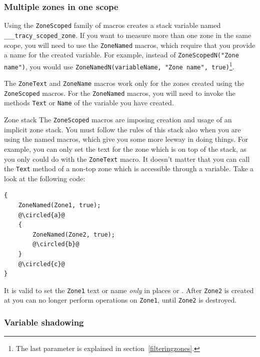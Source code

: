\documentclass[hidelinks,titlepage,a4paper]{article}
\newcommand*\circled[1]{\tikz[baseline=(char.base)]{
    \node[shape=circle,draw,inner sep=1.5pt] (char) {#1};}}
\begin{document}
\subsubsection{Multiple zones in one scope}
\label{multizone}

Using the \texttt{ZoneScoped} family of macros creates a stack variable named \texttt{\_\_\_tracy\_scoped\_zone}. If you want to measure more than one zone in the same scope, you will need to use the \texttt{ZoneNamed} macros, which require that you provide a name for the created variable. For example, instead of \texttt{ZoneScopedN("Zone name")}, you would use \texttt{ZoneNamedN(variableName, "Zone name", true)}\footnote{The last parameter is explained in section~\ref{filteringzones}.}.

The \texttt{ZoneText} and \texttt{ZoneName} macros work only for the zones created using the \texttt{ZoneScoped} macros. For the \texttt{ZoneNamed} macros, you will need to invoke the methods \texttt{Text} or \texttt{Name} of the variable you have created.

\begin{bclogo}[
noborder=true,
couleur=black!5,
logo=\bcattention
]{Zone stack}
The \texttt{ZoneScoped} macros are imposing creation and usage of an implicit zone stack. You must follow the rules of this stack also when you are using the named macros, which give you some more leeway in doing things. For example, you can only set the text for the zone which is on top of the stack, as you only could do with the \texttt{ZoneText} macro. It doesn't matter that you can call the \texttt{Text} method of a non-top zone which is accessible through a variable. Take a look at the following code:

\begin{lstlisting}
{
	ZoneNamed(Zone1, true);
	@\circled{a}@
	{
		ZoneNamed(Zone2, true);
		@\circled{b}@
	}
	@\circled{c}@
}
\end{lstlisting}

It is valid to set the \texttt{Zone1} text or name \emph{only} in places \circled{a} or \circled{c}. After \texttt{Zone2} is created at \circled{b} you can no longer perform operations on \texttt{Zone1}, until \texttt{Zone2} is destroyed.

\end{bclogo}

\subsubsection{Variable shadowing}
\end{document}
